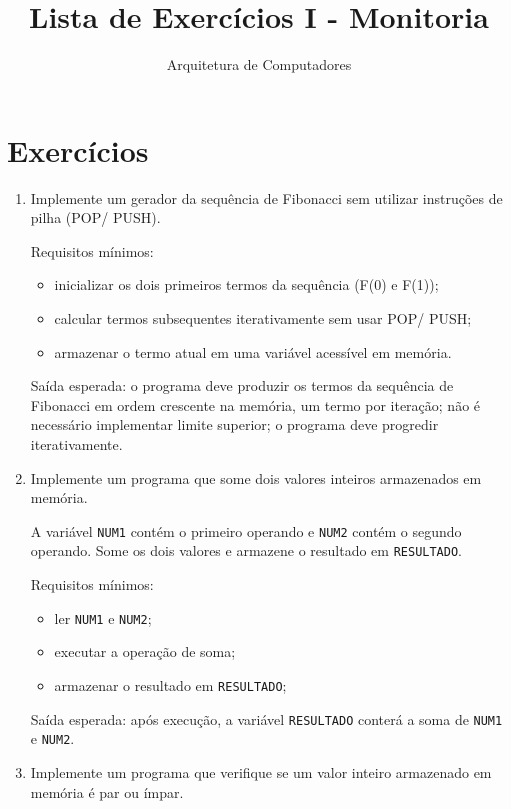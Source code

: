 \documentclass[12pt,a4paper]{article}
\title{Lista de Exercícios I - Monitoria}
\author{Arquitetura de Computadores}
\date{}
\begin{document}
\maketitle

\section*{Exercícios}
\begin{enumerate}[left=0pt,label=\textbf{Exercício \arabic*:},itemsep=8pt]

\item Implemente um gerador da sequência de Fibonacci sem utilizar instruções de pilha (POP/ PUSH).

Requisitos mínimos:
\begin{itemize}
	\item inicializar os dois primeiros termos da sequência (F(0) e F(1));
	\item calcular termos subsequentes iterativamente sem usar POP/ PUSH;
	\item armazenar o termo atual em uma variável acessível em memória.
\end{itemize}

Saída esperada: o programa deve produzir os termos da sequência de Fibonacci em ordem crescente na memória, um termo por iteração; não é necessário implementar limite superior; o programa deve progredir iterativamente.

\item Implemente um programa que some dois valores inteiros armazenados em memória.

A variável \texttt{NUM1} contém o primeiro operando e \texttt{NUM2} contém o segundo operando. Some os dois valores e armazene o resultado em \texttt{RESULTADO}.

Requisitos mínimos:
\begin{itemize}
	\item ler \texttt{NUM1} e \texttt{NUM2};
	\item executar a operação de soma;
	\item armazenar o resultado em \texttt{RESULTADO};
\end{itemize}

Saída esperada: após execução, a variável \texttt{RESULTADO} conterá a soma de \texttt{NUM1} e \texttt{NUM2}.

\item Implemente um programa que verifique se um valor inteiro armazenado em memória é par ou ímpar.


\end{enumerate}
\end{document}

